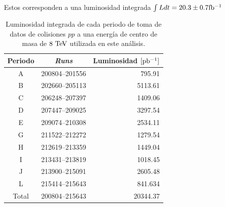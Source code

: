 Estos corresponden a una luminosidad integrada $\int L dt = 20.3 \pm 0.7 \mbox{fb$^{-1}$}$
\cite{lumi2012}

\begin{table}[ht]
  \centering
  \caption{Luminosidad integrada de cada periodo de toma de datos de colisiones
    $pp$ a una energía de centro de masa de $8 \tev$ utilizada en este
    análisis.}
  \begin{tabular}{c|c|r}
    \hline \hline Periodo & \emph{Runs} & Luminosidad $[\mbox{pb$^{-1}$}]$ \\
    \hline \hline
    A & 200804--201556 & 795.91 \\
    B & 202660--205113 & 5113.61 \\
    C & 206248--207397 & 1409.06 \\
    D & 207447--209025 & 3297.54 \\
    E & 209074--210308 & 2534.11 \\
    G & 211522--212272 & 1279.54 \\
    H & 212619--213359 & 1449.04 \\
    I & 213431--213819 & 1018.45 \\
    J & 213900--215091 & 2605.48 \\
    L & 215414--215643 & 841.634 \\
    \hline \hline
    Total & 200804--215643 & 20344.37 \\
    \hline \hline
  \end{tabular}
  \label{tab:data_periods}
\end{table}



